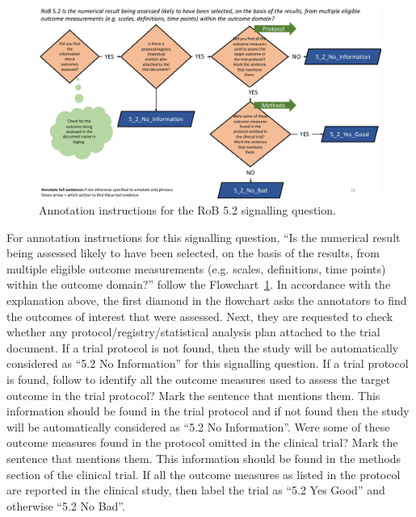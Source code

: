 \documentclass[sn-mathphys,Numbered]{sn-jnl}%
\begin{document}
%
%
%
\begin{figure}[htbp]
    \centering
    \includegraphics[width=\textwidth]{figures/5_2.pdf}
    \caption{Annotation instructions for the RoB 5.2 signalling question.}
    \label{fig:5_2}
\end{figure}
%
%
%

For annotation instructions for this signalling question, ``Is the numerical result being assessed likely to have been selected, on the basis of the results, from multiple eligible outcome measurements (e.g. scales, definitions, time points) within the outcome domain?'' follow the Flowchart~\ref{fig:5_2}.
In accordance with the explanation above, the first diamond in the flowchart asks the annotators to find the outcomes of interest that were assessed. 
Next, they are requested to check whether any protocol/registry/statistical analysis plan attached to the trial document.
If a trial protocol is not found, then the study will be automatically considered as ``5.2 No Information'' for this signalling question.
If a trial protocol is found, follow to identify all the outcome measures used to assess the target outcome in the trial protocol? 
Mark the sentence that mentions them.
This information should be found in the trial protocol and if not found then the study will be automatically considered as ``5.2 No Information''.
Were some of these outcome measures found in the protocol omitted in the clinical trial?
Mark the sentence that mentions them.
This information should be found in the methods section of the clinical trial.
If all the outcome measures as listed in the protocol are reported in the clinical study, then label the trial as ``5.2 Yes Good'' and otherwise ``5.2 No Bad''.

%
%
%
\end{document}

